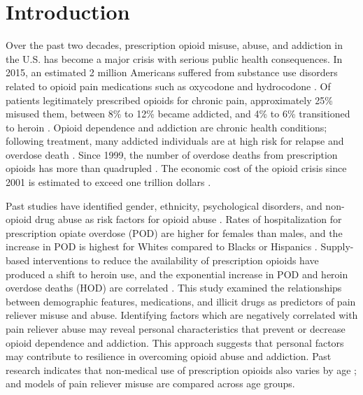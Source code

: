 \documentclass[sigconf]{acmart}
\begin{document}
\maketitle


\section{Introduction}

Over the past two decades, prescription opioid misuse, abuse, and addiction 
in the U.S. has become a major crisis with serious public health consequences.
In 2015, an estimated 2 million Americans suffered from substance use disorders 
related to opioid pain medications such as oxycodone and hydrocodone 
\cite{nida18,cdc18}. Of patients legitimately prescribed opioids for chronic 
pain, approximately 25\% misused them, between 8\% to 12\% became addicted, and 
4\% to 6\% transitioned to heroin \cite{vowles15, carlson16}. Opioid dependence 
and addiction are chronic health conditions; following treatment, many addicted 
individuals are at high risk for relapse and overdose death \cite{shaham03}. 
Since 1999, the number of overdose deaths from prescription opioids has more 
than quadrupled \cite{cdc16}. The economic cost of the opioid crisis since 2001 
is estimated to exceed one trillion dollars \cite{altarum18}. 

Past studies have identified gender, ethnicity, psychological disorders, and 
non-opioid drug abuse as risk factors for opioid abuse \cite{yokell13,rice12}. 
Rates of hospitalization for prescription opiate overdose (POD) are higher for 
females than males, and the increase in POD is highest for Whites compared to 
Blacks or Hispanics \cite{unick13}. Supply-based interventions to reduce the 
availability of prescription opioids have produced a shift to heroin use, and 
the exponential increase in POD and heroin overdose deaths (HOD) are correlated 
\cite{jones15,reifler12}. This study examined the relationships between 
demographic features, medications, and illicit drugs as predictors of pain 
reliever misuse and abuse. Identifying factors which are negatively correlated
with pain reliever abuse may reveal personal characteristics that prevent or
decrease opioid dependence and addiction. This approach suggests that personal 
factors may contribute to resilience in overcoming opioid abuse and addiction. 
Past research indicates that non-medical use of prescription opioids also varies 
by age \cite{mccabe12}; and models of pain reliever misuse are compared across 
age groups.
\end{document}
